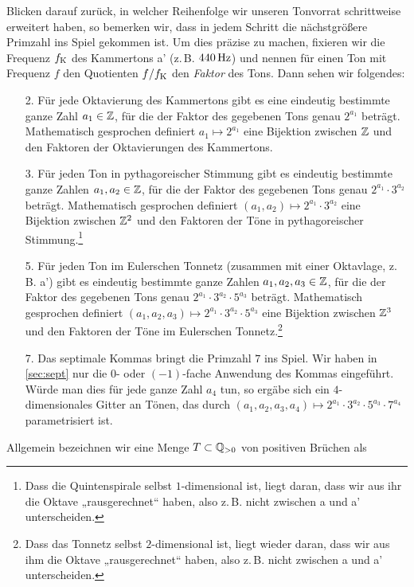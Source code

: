 Blicken darauf zurück, in welcher Reihenfolge wir unseren Tonvorrat schrittweise
erweitert haben, so bemerken wir, dass in jedem Schritt die nächstgrößere
Primzahl ins Spiel gekommen ist. Um dies präzise zu machen, fixieren wir die
Frequenz $f_{\text K}$ des Kammertons a’ (z.\,B. $440\,\text{Hz}$) und nennen für einen Ton mit
Frequenz $f$ den Quotienten $f/f_{\text K}$ den \emph{Faktor} des Tons. Dann sehen wir
folgendes:
\begin{enumerate}
	\item[2.] Für jede Oktavierung des Kammertons gibt es eine eindeutig bestimmte
	ganze Zahl $a_1\in\mathbb{Z}$, für die der Faktor des gegebenen Tons genau $2^{a_1}$
	beträgt. Mathematisch gesprochen definiert $a_1\mapsto 2^{a_1}$ eine Bijektion
	zwischen $\mathbb{Z}$ und den Faktoren der Oktavierungen des Kammertons.
	\item[3.] Für jeden Ton in pythagoreischer Stimmung gibt es eindeutig bestimmte
	ganze Zahlen $a_1,a_2\in\mathbb{Z}$, für die der Faktor des gegebenen Tons genau
	$2^{a_1}\cdot 3^{a_2}$ beträgt. Mathematisch gesprochen definiert
	$(a_1,a_2)\mapsto 2^{a_1}\cdot 3^{a_2}$ eine Bijektion zwischen $\mathbb{Z}^2$ und den
	Faktoren der Töne in pythagoreischer Stimmung.\footnote{Dass die
		Quintenspirale selbst $1$-dimensional ist, liegt daran, dass wir aus ihr die
		Oktave „rausgerechnet“ haben, also z.\,B. nicht zwischen \flat a und \flat
		a’ unterscheiden.}
	\item[5.] Für jeden Ton im Eulerschen Tonnetz (zusammen mit einer Oktavlage,
	z.\,B. \flatp a’) gibt es eindeutig bestimmte ganze Zahlen $a_1,a_2,a_3\in\mathbb{Z}$,
	für die der Faktor des gegebenen Tons genau
	$2^{a_1}\cdot 3^{a_2}\cdot 5^{a_3}$ beträgt.  Mathematisch gesprochen
	definiert $(a_1,a_2,a_3)\mapsto 2^{a_1}\cdot 3^{a_2}\cdot 5^{a_3}$ eine
	Bijektion zwischen $\mathbb{Z}^3$ und den Faktoren der Töne im Eulerschen
	Tonnetz.\footnote{Dass das Tonnetz selbst $2$-dimensional ist, liegt wieder
		daran, dass wir aus ihm die Oktave „rausgerechnet“ haben, also z.\,B. nicht
		zwischen \flatp a und \flatp a’ unterscheiden.}
	\item[7.] Das septimale Kommas bringt die Primzahl $7$ ins Spiel. Wir haben in
	\cref{sec:sept} nur die $0$- oder $(-1)$-fache Anwendung des Kommas
	eingeführt. Würde man dies für jede ganze Zahl $a_4$ tun, so ergäbe sich ein
	$4$-dimensionales Gitter an Tönen, das durch
	$(a_1,a_2,a_3,a_4)\mapsto 2^{a_1}\cdot 3^{a_2}\cdot 5^{a_3}\cdot 7^{a_4}$
	parametrisiert ist.\end{enumerate}
Allgemein bezeichnen wir eine Menge $T\subset \mathbb{Q}_{>0}$ von positiven Brüchen als
